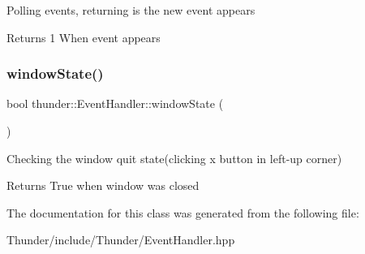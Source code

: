 Polling events, returning is the new event appears \begin{DoxyReturn}{Returns}
1 When event appears 
\end{DoxyReturn}
\mbox{\label{classthunder_1_1_event_handler_a1740cedd7f75823bb0382d726adb397f}} 
\subsubsection{\texorpdfstring{window\+State()}{windowState()}}
{\footnotesize\ttfamily bool thunder\+::\+Event\+Handler\+::window\+State (\begin{DoxyParamCaption}{ }\end{DoxyParamCaption})}

Checking the window quit state(clicking x button in left-\/up corner) \begin{DoxyReturn}{Returns}
True when window was closed 
\end{DoxyReturn}


The documentation for this class was generated from the following file\+:\begin{DoxyCompactItemize}
\item 
Thunder/include/\+Thunder/Event\+Handler.\+hpp\end{DoxyCompactItemize}
